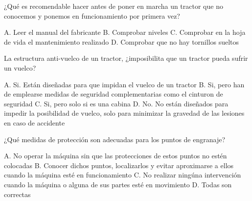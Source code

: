 \documentclass[11pt]{exam}
\begin{document}
{\begin{questions}
\question ¿Qué es recomendable hacer antes de poner en marcha un tractor que no
  conocemos y ponemos en funcionamiento por primera vez? 
\begin{checkboxes}
\CorrectChoice A. Leer el manual del fabricante
\choice B. Comprobar niveles
\choice C. Comprobar en la hoja de vida el mantenimiento realizado
\choice D. Comprobar que no hay tornillos sueltos
\end{checkboxes}

\question La estructura anti-vuelco de un tractor, ¿imposibilita que un tractor
  pueda sufrir un vuelco? 
\begin{checkboxes}
\choice A. Si. Están diseñadas para que impidan el vuelco de un tractor
\choice B. Si, pero han de emplearse medidas de seguridad complementarias como
el cinturon de seguridad
\choice C. Si, pero solo si es una cabina
\CorrectChoice D. No. No están diseñados para impedir la posibilidad de vuelco,
solo para minimizar la gravedad de las lesiones en caso de accidente 
\end{checkboxes}

\question ¿Qué medidas de protección son adecuadas para los puntos de engranaje?
\begin{checkboxes}
\choice A. No operar la máquina sin que las protecciones de estos puntos no estén colocadas
\choice B. Conocer dichos puntos, localizarlos y evitar aproximarse a ellos
cuando la máquina esté en funcionamiento 
\choice C. No realizar ningúna intervención cuando la máquina o alguna de sus
partes esté en movimiento 
\CorrectChoice D. Todas son correctas
\end{checkboxes}

\end{questions}}
\end{document}
